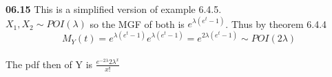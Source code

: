 {\bf 06.15} \quad This is a simplified version of example 6.4.5.
\\

$X_1, X_2 \sim POI(\lambda)$ so the MGF of both is $e^{\lambda(e^t - 1)}$. Thus by theorem 6.4.4 
\\

\[M_Y(t) = e^{\lambda(e^t - 1)}e^{\lambda(e^t - 1)} = e^{2\lambda(e^t - 1)} \sim POI(2\lambda)\]
\\
The pdf then of Y is $\frac{e^{-2\lambda}2\lambda^x}{x!}$

